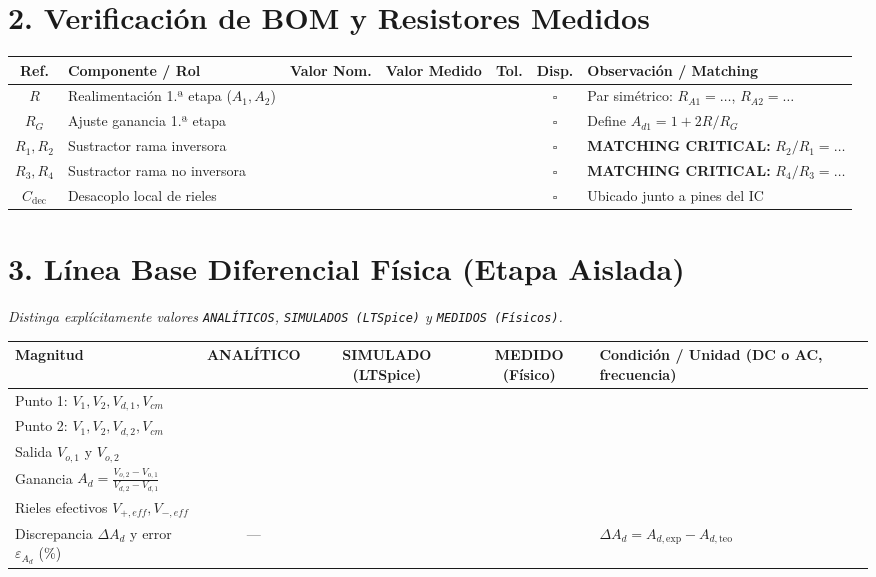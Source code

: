 \documentclass[10pt, a4paper]{article}
\begin{document}
\section*{2. Verificación de BOM y Resistores Medidos}
\begin{table}[htbp]
    \centering
    \footnotesize
    \renewcommand{\arraystretch}{1.35}
    \begin{tabularx}{\textwidth}{|c|l|c|c|c|c|>{\raggedright\arraybackslash}X|}
    \hline
    \rowcolor[HTML]{EFEFEF} 
    \textbf{Ref.} & \textbf{Componente / Rol} & \textbf{Valor Nom.} & \textbf{Valor Medido} & \textbf{Tol.} & \textbf{Disp.} & \textbf{Observación / Matching} \\ \hline
    $R$ & Realimentación 1.ª etapa ($A_1, A_2$) & & & & $\square$ & Par simétrico: $R_{A1} = \dots$, $R_{A2} = \dots$ \\ \hline
    $R_G$ & Ajuste ganancia 1.ª etapa & & & & $\square$ & Define $A_{d1} = 1 + 2R/R_G$ \\ \hline
    $R_1, R_2$ & Sustractor rama inversora & & & & $\square$ & \textbf{MATCHING CRITICAL:} $R_2/R_1 = \dots$ \\ \hline
    $R_3, R_4$ & Sustractor rama no inversora & & & & $\square$ & \textbf{MATCHING CRITICAL:} $R_4/R_3 = \dots$ \\ \hline
    $C_{\mathrm{dec}}$ & Desacoplo local de rieles & & & & $\square$ & Ubicado junto a pines del IC \\ \hline
    \end{tabularx}
\end{table}

\section*{3. Línea Base Diferencial Física (Etapa Aislada)}
\textit{Distinga explícitamente valores \texttt{ANALÍTICOS}, \texttt{SIMULADOS (LTSpice)} y \texttt{MEDIDOS (Físicos)}.}

\begin{table}[htbp]
    \centering
    \footnotesize
    \renewcommand{\arraystretch}{1.4}
    \begin{tabularx}{\textwidth}{|>{\raggedright\arraybackslash}p{4.5cm}|c|c|c|>{\raggedright\arraybackslash}X|}
    \hline
    \rowcolor[HTML]{EFEFEF} 
    \textbf{Magnitud} & \textbf{ANALÍTICO} & \textbf{SIMULADO (LTSpice)} & \textbf{MEDIDO (Físico)} & \textbf{Condición / Unidad (DC o AC, frecuencia)} \\ \hline
    Punto 1: $V_1, V_2, V_{d,1}, V_{cm}$ & & & & \\ \hline
    Punto 2: $V_1, V_2, V_{d,2}, V_{cm}$ & & & & \\ \hline
    Salida $V_{o,1}$ y $V_{o,2}$ & & & & \\ \hline
    Ganancia $A_d = \frac{V_{o,2}-V_{o,1}}{V_{d,2}-V_{d,1}}$ & & & & \\ \hline
    Rieles efectivos $V_{+,eff}, V_{-,eff}$ & & & & \\ \hline
    Discrepancia $\Delta A_d$ y error $\varepsilon_{A_d}$ (\%) & --- & & & $\Delta A_d = A_{d,\mathrm{exp}}-A_{d,\mathrm{teo}}$ \\ \hline
    \end{tabularx}
\end{table}
\end{document}
